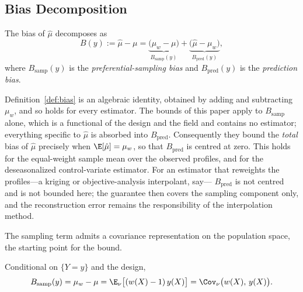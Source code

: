 \subsection{Bias Decomposition}
\label{sec:defbias}

\begin{definition}
\label{def:bias}
The bias of $\hat\mu$ decomposes as
\[
  B(y) := \hat\mu - \mu
  = \underbrace{\big(\mu_w - \mu\big)}_{\textstyle B_{\mathrm{samp}}(y)}
  + \underbrace{\big(\hat\mu - \mu_w\big)}_{\textstyle B_{\mathrm{pred}}(y)},
\]
where $B_{\mathrm{samp}}(y)$ is the \emph{preferential-sampling bias}
and $B_{\mathrm{pred}}(y)$ is the \emph{prediction bias}. \end{definition}

\begin{remark}
\label{rem:bias-scope}
Definition~\ref{def:bias} is an algebraic identity, obtained by adding
and subtracting $\mu_w$, and so holds for every estimator. The bounds of
this paper apply to $B_{\mathrm{samp}}$ alone, which is a functional of
the design and the field and contains no estimator; everything specific
to $\hat\mu$ is absorbed into $B_{\mathrm{pred}}$. Consequently they
bound the \emph{total} bias of $\hat\mu$ precisely when
$\E[\hat\mu]=\mu_w$, so that $B_{\mathrm{pred}}$ is centred at zero. This
holds for the equal-weight sample mean over the observed profiles, and
for the deseasonalized control-variate estimator. For an estimator that reweights the
profiles---a kriging or objective-analysis interpolant, say---
$B_{\mathrm{pred}}$ is not centred and is not bounded here; the guarantee
then covers the sampling component only, and the reconstruction error
remains the responsibility of the interpolation method.
\end{remark}

The sampling term admits a covariance representation on the population
space, the starting point for the bound.

\begin{proposition}
\label{prop:cov-identity}
Conditional on $\{Y=y\}$ and the design, 
\[
  B_{\mathrm{samp}}(y) = \mu_w - \mu
  = \E_\nu\big[(w(X)-1)\,y(X)\big]
  = \Cov_\nu\big(w(X),\,y(X)\big).
\]
\end{proposition}

